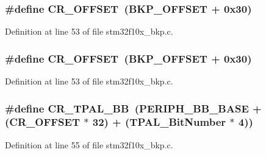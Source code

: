 \subsubsection[{\texorpdfstring{C\+R\+\_\+\+O\+F\+F\+S\+ET}{CR_OFFSET}}]{\setlength{\rightskip}{0pt plus 5cm}\#define C\+R\+\_\+\+O\+F\+F\+S\+ET~({\bf B\+K\+P\+\_\+\+O\+F\+F\+S\+ET} + 0x30)}\hypertarget{group___b_k_p___private___defines_gafa1d3d0ea72132df651c76fc1bdffffc}{}\label{group___b_k_p___private___defines_gafa1d3d0ea72132df651c76fc1bdffffc}


Definition at line 53 of file stm32f10x\+\_\+bkp.\+c.

\subsubsection[{\texorpdfstring{C\+R\+\_\+\+O\+F\+F\+S\+ET}{CR_OFFSET}}]{\setlength{\rightskip}{0pt plus 5cm}\#define C\+R\+\_\+\+O\+F\+F\+S\+ET~({\bf B\+K\+P\+\_\+\+O\+F\+F\+S\+ET} + 0x30)}\hypertarget{group___b_k_p___private___defines_gafa1d3d0ea72132df651c76fc1bdffffc}{}\label{group___b_k_p___private___defines_gafa1d3d0ea72132df651c76fc1bdffffc}


Definition at line 53 of file stm32f10x\+\_\+bkp.\+c.

\subsubsection[{\texorpdfstring{C\+R\+\_\+\+T\+P\+A\+L\+\_\+\+BB}{CR_TPAL_BB}}]{\setlength{\rightskip}{0pt plus 5cm}\#define C\+R\+\_\+\+T\+P\+A\+L\+\_\+\+BB~({\bf P\+E\+R\+I\+P\+H\+\_\+\+B\+B\+\_\+\+B\+A\+SE} + ({\bf C\+R\+\_\+\+O\+F\+F\+S\+ET} $\ast$ 32) + ({\bf T\+P\+A\+L\+\_\+\+Bit\+Number} $\ast$ 4))}\hypertarget{group___b_k_p___private___defines_gaa36e52f37b9fa6982bd224a6dcb86f78}{}\label{group___b_k_p___private___defines_gaa36e52f37b9fa6982bd224a6dcb86f78}


Definition at line 55 of file stm32f10x\+\_\+bkp.\+c.

